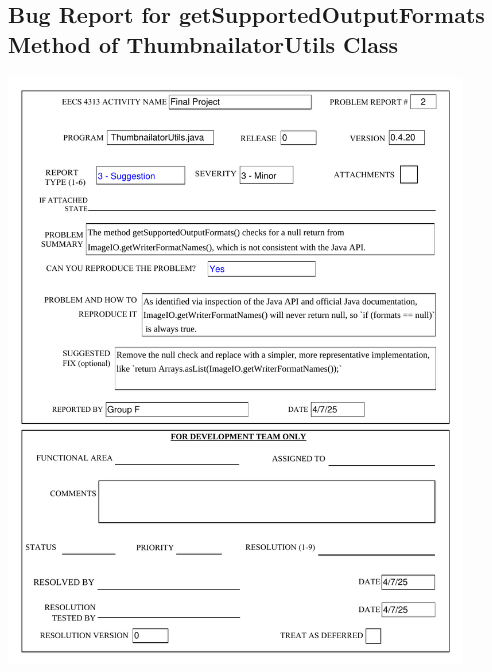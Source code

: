 \documentclass[12pt]{article}
\begin{document}
\begin{appendices}
        \section{Bug Report for getSupportedOutputFormats Method of ThumbnailatorUtils Class}
        \label{sec:appendix_b}
        \markboth{}{}
        \begin{center}
            \includegraphics[width=0.9\textwidth]{bug_reports/Bug_Report_2_print.pdf}
        \end{center}
    \end{appendices}
\end{document}
